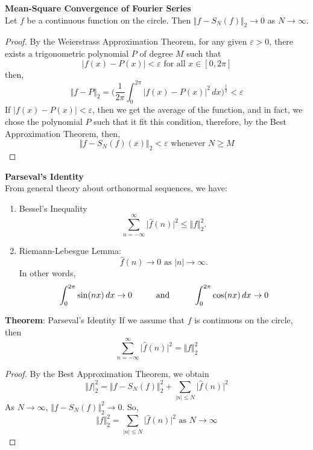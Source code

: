 \documentclass[12pt]{article}
\begin{document}
\noindent \textbf{Mean-Square Convergence of Fourier Series} \\
\noindent Let $f$ be a continuous function on the circle. Then $\Vert f- S_N(f) \Vert_2 \rightarrow 0$ as $N\rightarrow \infty$.

\begin{proof}
By the Weierstrass Approximation Theorem, for any given $\varepsilon>0$, there exists a trigonometric polynomial $P$ of degree $M$ such that 
$$\vert f(x) - P(x) \vert < \varepsilon \text{ for all } x \in [0,2\pi]$$
\noindent then,
$$\Vert f - P\Vert_2 = \Big( \frac{1}{2\pi} \int^{2\pi}_0 \vert f(x) - P(x)\vert^2 \, dx \Big)^\frac{1}{2} < \varepsilon$$
\noindent If $\vert f(x)-P(x) \vert < \varepsilon$, then we get the average of the function, and in fact, we chose the polynomial $P$ such that it fit this condition, therefore, by the Best Approximation Theorem, then,
$$\Vert f- S_N(f)(x)\Vert_2 < \varepsilon \text{ whenever } N \geq M$$
\end{proof}

\noindent \textbf{Parseval's Identity} \\
\noindent From general theory about orthonormal sequences, we have:
\begin{enumerate}[itemsep=0pt, topsep=0pt, parsep=0pt, partopsep=0pt] 
\item Bessel's Inequality
$$ \sum^\infty_{n=-\infty} \vert \hat{f}(n) \vert^2 \leq \Vert f \Vert_2^2.$$
\item Riemann-Lebesgue Lemma:
$$\hat{f}(n) \rightarrow 0 \text { as } \vert n \vert \rightarrow \infty.$$
In other words, 
$$\int^{2\pi}_0 \sin(nx) \, dx \rightarrow 0 \hspace*{25pt} \text{ and } \hspace*{25pt} 
\int^{2\pi}_0 \cos(nx) \, dx \rightarrow 0$$
\end{enumerate}

\noindent \textbf{Theorem}: Parseval's Identity
\noindent If we assume that $f$ is continuous on the circle, then 
$$\sum^\infty_{n=-\infty} \vert \hat{f}(n) \vert^2 = \Vert f \Vert_2^2$$

\begin{proof}
By the Best Approximation Theorem, we obtain
$$\Vert f \vert^2_2 = \Vert f - S_N(f) \Vert_2^2 + \sum_{\vert n \vert \leq N} \vert \hat{f}(n) \vert^2$$
As $N \rightarrow \infty$, $\Vert f- S_N(f)\Vert_2^2 \rightarrow 0$. So, 
$$\Vert f \Vert_2^2 = \sum_{\vert n \vert \leq N} \vert \hat{f}{(n) \vert^2} \text{ as } N \rightarrow \infty$$
\end{proof}
\end{document}

